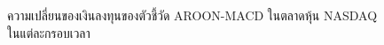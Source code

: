 \begin{figure}[!ht]
    \centering
    \caption{ความเปลี่ยนของเงินลงทุนของตัวชี้วัด AROON-MACD ในตลาดหุ้น NASDAQ ในแต่ละกรอบเวลา}
    \label{fig:aroon-macd-stock-all}
\end{figure}

